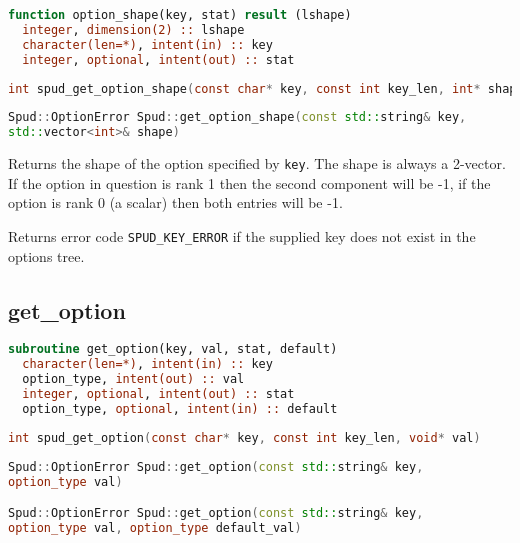 \documentclass[a4paper, 11pt]{book}
\begin{document}
\begin{lstlisting}[language=fortran]
function option_shape(key, stat) result (lshape)
  integer, dimension(2) :: lshape
  character(len=*), intent(in) :: key
  integer, optional, intent(out) :: stat
\end{lstlisting}

\begin{lstlisting}[language=C]
int spud_get_option_shape(const char* key, const int key_len, int* shape)
\end{lstlisting}

\begin{lstlisting}[language=C++]
Spud::OptionError Spud::get_option_shape(const std::string& key,
std::vector<int>& shape)
\end{lstlisting}

Returns the shape of the option specified by \lstinline+key+. The shape is
always a 2-vector. If the option in question is rank 1 then the second
component will be -1, if the option is rank 0 (a scalar) then both entries
will be -1.

Returns error code \lstinline+SPUD_KEY_ERROR+ if the supplied key does not
exist in the options tree.

\subsection{get\_option}\label{sec:get_option}

\begin{lstlisting}[language=fortran,emph=option_type,emphstyle=\textit]
subroutine get_option(key, val, stat, default)
  character(len=*), intent(in) :: key
  option_type, intent(out) :: val
  integer, optional, intent(out) :: stat
  option_type, optional, intent(in) :: default
\end{lstlisting}

\begin{lstlisting}[language=C,emph=option_type,emphstyle=\textit]
int spud_get_option(const char* key, const int key_len, void* val)
\end{lstlisting}

\begin{lstlisting}[language=C++,emph=option_type,emphstyle=\textit]
Spud::OptionError Spud::get_option(const std::string& key,
option_type val)

Spud::OptionError Spud::get_option(const std::string& key,
option_type val, option_type default_val)
\end{lstlisting}
\end{document}
